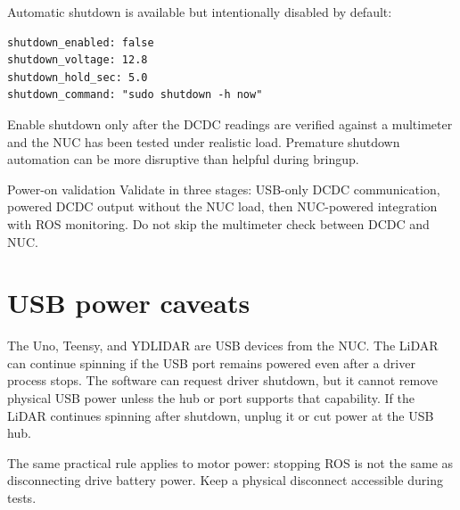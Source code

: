 Automatic shutdown is available but intentionally disabled by default:

\begin{lstlisting}[language={}]
shutdown_enabled: false
shutdown_voltage: 12.8
shutdown_hold_sec: 5.0
shutdown_command: "sudo shutdown -h now"
\end{lstlisting}

Enable shutdown only after the DCDC readings are verified against a multimeter and the NUC has been tested under realistic load. Premature shutdown automation can be more disruptive than helpful during bringup.

\begin{safetybox}{Power-on validation}
Validate in three stages: USB-only DCDC communication, powered DCDC output without the NUC load, then NUC-powered integration with ROS monitoring. Do not skip the multimeter check between DCDC and NUC.
\end{safetybox}

\section{USB power caveats}

The Uno, Teensy, and YDLIDAR are USB devices from the NUC. The LiDAR can continue spinning if the USB port remains powered even after a driver process stops. The software can request driver shutdown, but it cannot remove physical USB power unless the hub or port supports that capability. If the LiDAR continues spinning after shutdown, unplug it or cut power at the USB hub.

The same practical rule applies to motor power: stopping ROS is not the same as disconnecting drive battery power. Keep a physical disconnect accessible during tests.
